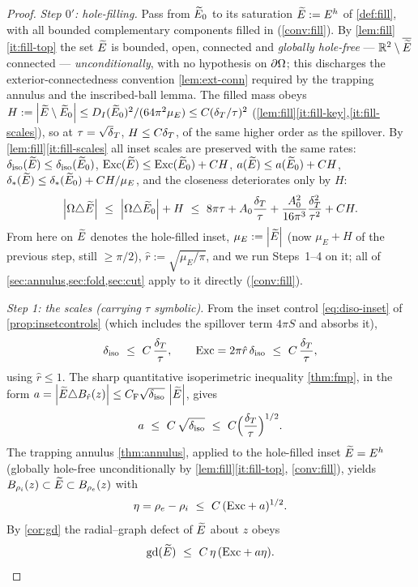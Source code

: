 \begin{proof}
\emph{Step $0'$: hole-filling.} Pass from $\widetilde{E}_0$ to its saturation
$\widetilde{E}:=E^h$ of \cref{def:fill}, with all bounded complementary components
filled in (\cref{conv:fill}). By \cref{lem:fill}\ref{it:fill-top} the set
$\widetilde{E}$ is bounded, open, connected and \emph{globally hole-free} ---
$\mathbb{R}^2\setminus\overline{\widetilde{E}}$ connected --- \emph{unconditionally}, with no
hypothesis on $\partial\Omega$; this discharges the exterior-connectedness
convention \cref{lem:ext-conn} required by the trapping annulus and the
inscribed-ball lemma. The filled mass obeys $H:=\left\lvert\widetilde{E}\setminus\widetilde{E}_0\right\rvert
\le D_I(\widetilde{E}_0)^2/(64\pi^2\mu_E)\le C(\delta_T/\tau)^2$
(\cref{lem:fill}\ref{it:fill-key},\ref{it:fill-scales}), so at $\tau=\sqrt\dT$,
$H\le C\delta_T$, of the same higher order as the spillover. By
\cref{lem:fill}\ref{it:fill-scales} all inset scales are preserved with the
same rates: $\delta_{\mathrm{iso}}(\widetilde{E})\le\delta_{\mathrm{iso}}(\widetilde{E}_0)$, $\mathrm{Exc}(\widetilde{E})\le\mathrm{Exc}(\widetilde{E}_0)+CH$,
$a(\widetilde{E})\le a(\widetilde{E}_0)+CH$, $\delta_{*}(\widetilde{E})\le\delta_{*}(\widetilde{E}_0)+CH/\mu_E$, and
the closeness deteriorates only by $H$:
\begin{equation}\label{eq:m-fillclose}
   \abs{\Om\triangle\Etil}\ \le\ \abs{\Om\triangle\Etil_0}+H
   \ \le\ 8\pi\tau+A_0\frac\dT\tau+\frac{A_0^2}{16\pi^3}\frac{\dT^2}{\tau^2}+CH.
\end{equation}
From here on $\widetilde{E}$ denotes the hole-filled inset, $\mu_E:=\left\lvert\widetilde{E}\right\rvert$ (now
$\mu_E+H$ of the previous step, still $\ge\pi/2$), $\hat r:=\sqrt{\mu_E/\pi}$,
and we run Steps~1--4 on it; all of \cref{sec:annulus,sec:fold,sec:cut} apply
to it directly (\cref{conv:fill}).

\emph{Step 1: the scales (carrying $\tau$ symbolic).} From the inset control
\eqref{eq:diso-inset} of \cref{prop:insetcontrols} (which includes the
spillover term $4\pi S$ and absorbs it),
\begin{equation}\label{eq:m-diso}
   \delta_{\mathrm{iso}}\ \le\ C\,\frac{\delta_T}\tau,
   \qquad
   \mathrm{Exc}=2\pi\hat r\,\delta_{\mathrm{iso}}\ \le\ C\,\frac{\delta_T}\tau,
\end{equation}
using $\hat r\le1$. The sharp quantitative
isoperimetric inequality \cref{thm:fmp}, in the form
$a=\left\lvert\widetilde{E}\triangle B_{\hat r}(z)\right\rvert\le C_{\mathrm F}\sqrt{\delta_{\mathrm{iso}}}\,\left\lvert\widetilde{E}\right\rvert$,
gives
\begin{equation}\label{eq:m-a}
   a\ \le\ C\,\sqrt{\diso}\ \le\ C\Bigl(\frac\dT\tau\Bigr)^{1/2}.
\end{equation}
The trapping annulus \cref{thm:annulus}, applied to the hole-filled inset
$\widetilde{E}=E^h$ (globally hole-free unconditionally by \cref{lem:fill}\ref{it:fill-top},
\cref{conv:fill}), yields
$B_{\rho_i}(z)\subset\widetilde{E}\subset B_{\rho_e}(z)$ with
\begin{equation}\label{eq:m-eta}
   \eta=\rho_e-\rho_i\ \le\ C\,(\mathrm{Exc}+a)^{1/2}.
\end{equation}
By \cref{cor:gd} the radial--graph defect of $\widetilde{E}$ about $z$ obeys
\begin{equation}\label{eq:m-gd}
   \mathrm{gd}(\widetilde{E})\ \le\ C\,\eta\,(\mathrm{Exc}+a\eta).
\end{equation}


\end{proof}
